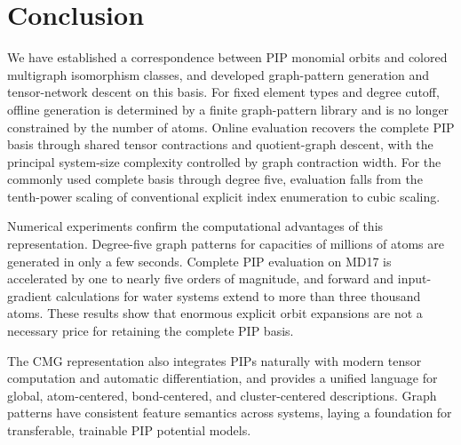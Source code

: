 \begingroup
{}
\section{Conclusion}\label{sec:conclusion}

We have established a correspondence between PIP monomial orbits and colored multigraph isomorphism classes, 
and developed graph-pattern generation and tensor-network descent on this basis. For fixed element types and degree cutoff, 
offline generation is determined by a finite graph-pattern library and is no longer constrained by the number of atoms. 
Online evaluation recovers the complete PIP basis through shared tensor contractions and quotient-graph descent, 
with the principal system-size complexity controlled by graph contraction width. 
For the commonly used complete basis through degree five, evaluation falls from the tenth-power scaling of conventional explicit index enumeration to cubic scaling.


Numerical experiments confirm the computational advantages of this representation. Degree-five graph patterns for capacities of millions of atoms are generated in only a few seconds. Complete PIP evaluation on MD17 is accelerated by one to nearly five orders of magnitude, and forward and input-gradient calculations for water systems extend to more than three thousand atoms. These results show that enormous explicit orbit expansions are not a necessary price for retaining the complete PIP basis.

The CMG representation also integrates PIPs naturally with modern tensor computation and automatic differentiation, and provides a unified language for global, atom-centered, bond-centered, and cluster-centered descriptions. Graph patterns have consistent feature semantics across systems, laying a foundation for transferable, trainable PIP potential models.
\par
\endgroup

